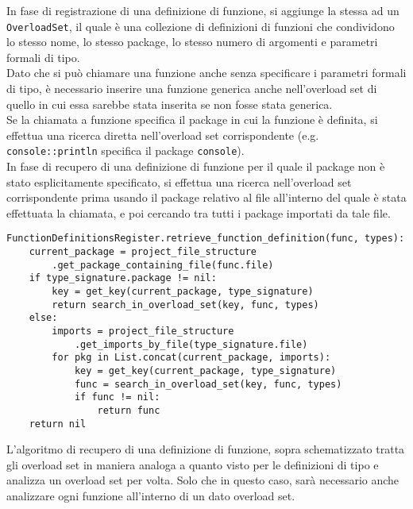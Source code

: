 In fase di registrazione di una definizione di funzione, si aggiunge la stessa ad un \texttt{OverloadSet}, 
il quale è una collezione di definizioni di funzioni che condividono lo stesso nome, lo stesso package, lo stesso numero di argomenti e 
parametri formali di tipo. \\

Dato che si può chiamare una funzione anche senza specificare i parametri formali di tipo, è necessario
inserire una funzione generica anche nell'overload set di quello in cui essa sarebbe stata inserita se non fosse 
stata generica. \\

Se la chiamata a funzione specifica il package in cui la funzione è definita, si effettua una ricerca diretta
nell'overload set corrispondente (e.g. \texttt{console::println} specifica il package \texttt{console}). \\

In fase di recupero di una definizione di funzione per il quale il package non è stato esplicitamente specificato, 
si effettua una ricerca nell'overload set corrispondente prima usando il package relativo al file all'interno del 
quale è stata effettuata la chiamata, e poi cercando tra tutti i package importati da tale file.

\vspace{0.5cm}
\begin{lstlisting}[frame=single]
FunctionDefinitionsRegister.retrieve_function_definition(func, types):
    current_package = project_file_structure
        .get_package_containing_file(func.file)
    if type_signature.package != nil:
        key = get_key(current_package, type_signature)
        return search_in_overload_set(key, func, types)
    else:
        imports = project_file_structure
            .get_imports_by_file(type_signature.file)
        for pkg in List.concat(current_package, imports):
            key = get_key(current_package, type_signature)
            func = search_in_overload_set(key, func, types)
            if func != nil:
                return func
    return nil
\end{lstlisting}
\vspace{0.5cm}

L'algoritmo di recupero di una definizione di funzione, sopra schematizzato tratta gli overload set in 
maniera analoga a quanto visto per le definizioni di tipo e analizza un overload set per volta. Solo che 
in questo caso, sarà necessario anche analizzare ogni funzione all'interno di un dato overload set. \\

